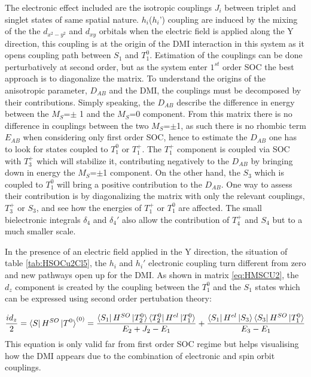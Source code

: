 \documentclass[10pt]{report}
\numberwithin{equation}{section}
\begin{document}
The electronic effect included are the isotropic couplings $J_i$ between triplet and singlet states of same spatial nature. 
$h_i$($h_i$') coupling are induced by the mixing of the the $d_{x^2-y^2}$ and $d_{xy}$ orbitals when the electric field is applied along the Y direction, this coupling is at the origin of the DMI interaction in this system as it opens coupling path between $S_1$ and $T_1^0$.
Estimation of the couplings can be done perturbatively at second order, but as the system enter $1^{st}$ order SOC the best approach is to diagonalize the matrix.
To understand the origins of the anisotropic parameter, $D_{AB}$ and the DMI, the couplings must be decomposed by their contributions.
Simply speaking, the $D_{AB}$ describe the difference in energy between the $M_S$=$\pm$ 1 and the $M_S$=0 component.
From this matrix there is no difference in couplings between the two $M_S$=$\pm$1, as such there is no rhombic term $E_{AB}$ when considering only first order SOC, hence to estimate the $D_{AB}$ one has to look for states coupled to $T_1^0$ or $T_1^+$.
The $T_1^+$ component is coupled via SOC with $T_3^+$ which will stabilize it, contributing negatively to the $D_{AB}$ by bringing down in energy the $M_S$=$\pm$1 component.
On the other hand, the $S_3$ which is coupled to $T_1^0$ will bring a positive contribution to the $D_{AB}$. 
One way to assess their contribution is by diagonalizing the matrix with only the relevant couplings, $T_3^+$ or $S_3$, and see how the energies of $T_1^+$ or $T_1^0$ are affected.
The small bielectronic integrals $\delta_4$ and $\delta_4'$ also allow the contribution of $T_4^+$ and $S_4$ but to a much smaller scale.

In the presence of an electric field applied in the Y direction, the situation of table \ref{tab:HSOCu2Cl5}, the $h_i$ and $h_i'$ electronic coupling turn different from zero and new pathways open up for the DMI.
As shown in matrix \ref{eq:HMSCU2}, the $d_z$ component is created by the coupling between the $T_1^0$ and the $S_1$ states which can be expressed using second order pertubation theory:

\begin{equation}\label{eq:chemindmi}
    \frac{id_z}{2}=\bra{S}H^{SO}\ket{T^0}^{(0)}=\frac{\bra{S_1}H^{SO}\ket{T_2^0}\bra{T_2^0}H^{el}\ket{T_1^0}}{E_2+J_2-E_1}+\frac{\bra{S_1}H^{el}\ket{S_3}\bra{S_3}H^{SO}\ket{T_1^0}}{E_3-E_1}
\end{equation}
This equation is only valid far from first order SOC regime but helps visualising how the DMI appears due to the combination of electronic and spin orbit couplings.
\end{document}
